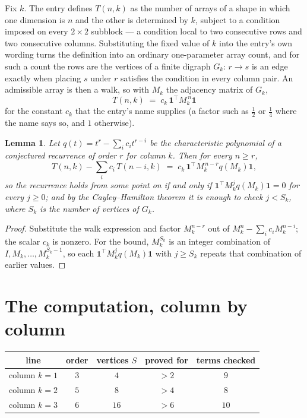 \documentclass[11pt,a4paper]{article}
\theoremstyle{plain}
\newtheorem{lemma}[theorem]{Lemma}
\theoremstyle{definition}
\begin{document}
Fix $k$. The entry defines $T(n,k)$ as the number of arrays of a shape in which one dimension
is $n$ and the other is determined by $k$, subject to a condition imposed on every
$2\times2$ subblock --- a condition local to two consecutive rows and two consecutive columns.
Substituting the fixed value of $k$ into the entry's own wording turns the definition into an
ordinary one-parameter array count, and for such a count the rows are the vertices of a finite
digraph $G_k$: $r\to s$ is an edge exactly when placing $s$ under $r$ satisfies the condition
in every column pair. An admissible array is then a walk, so with $M_k$ the adjacency matrix
of $G_k$,
\[
T(n,k)\;=\;c_k\,\mathbf{1}^{\!\top}M_k^{\,n}\mathbf{1}
\]
for the constant $c_k$ that the entry's name supplies (a factor such as $\tfrac12$ or
$\tfrac14$ where the name says so, and $1$ otherwise).

\begin{lemma}\label{lem:crit}
Let $q(t)=t^{r}-\sum_i c_it^{r-i}$ be the characteristic polynomial of a conjectured
recurrence of order $r$ for column $k$. Then for every $n\ge r$,
\[
T(n,k)-\sum_i c_i\,T(n-i,k)\;=\;c_k\,\mathbf{1}^{\!\top}M_k^{\,n-r}q(M_k)\mathbf{1},
\]
so the recurrence holds from some point on if and only if
$\mathbf{1}^{\!\top}M_k^{j}q(M_k)\mathbf{1}=0$ for every $j\ge0$; and by the
Cayley--Hamilton theorem it is enough to check $j<S_k$, where $S_k$ is the number of vertices
of $G_k$.
\end{lemma}

\begin{proof}
Substitute the walk expression and factor $M_k^{n-r}$ out of $M_k^{n}-\sum_ic_iM_k^{n-i}$;
the scalar $c_k$ is nonzero. For the bound, $M_k^{S_k}$ is an integer combination of
$I,M_k,\dots,M_k^{S_k-1}$, so each $\mathbf{1}^{\!\top}M_k^{j}q(M_k)\mathbf{1}$ with
$j\ge S_k$ repeats that combination of earlier values.
\end{proof}

\section{The computation, column by column}

\begin{center}
\begin{tabular}{ccccc}
line & order & vertices $S$ & proved for & terms checked \\ \hline
column $k$$=1$ & $3$ & $4$ & $>2$ & $9$ \\
column $k$$=2$ & $5$ & $8$ & $>4$ & $8$ \\
column $k$$=3$ & $6$ & $16$ & $>6$ & $10$ \\
\end{tabular}
\end{center}
\end{document}
